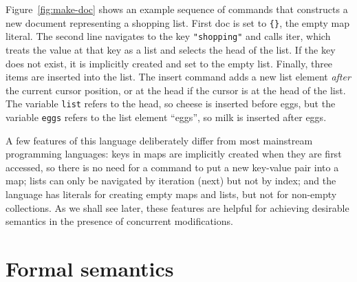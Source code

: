 \documentclass[10pt,journal,compsoc]{IEEEtran}
\begin{document}
Figure~\ref{fig:make-doc} shows an example sequence of commands that constructs a new document representing a shopping list. First \textsf{doc} is set to \verb|{}|, the empty map literal. The second line navigates to the key \verb|"shopping"| and calls \textsf{iter}, which treats the value at that key as a list and selects the head of the list. If the key does not exist, it is implicitly created and set to the empty list. Finally, three items are inserted into the list. The \textsf{insert} command adds a new list element \emph{after} the current cursor position, or at the head if the cursor is at the head of the list. The variable \verb|list| refers to the head, so cheese is inserted before eggs, but the variable \verb|eggs| refers to the list element ``eggs'', so milk is inserted after eggs.

A few features of this language deliberately differ from most mainstream programming languages: keys in maps are implicitly created when they are first accessed, so there is no need for a command to put a new key-value pair into a map; lists can only be navigated by iteration (\textsf{next}) but not by index; and the language has literals for creating empty maps and lists, but not for non-empty collections. As we shall see later, these features are helpful for achieving desirable semantics in the presence of concurrent modifications.

\section{Formal semantics}
\end{document}
